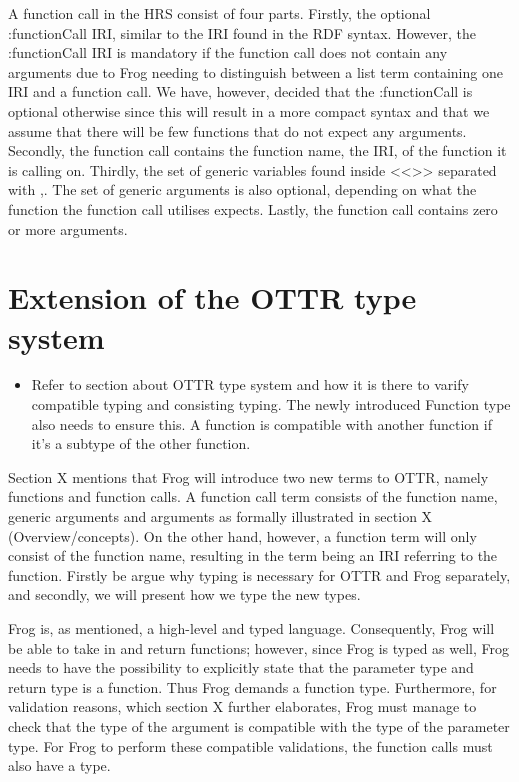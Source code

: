 \para 
A function call in the HRS consist of four parts. Firstly, the optional :functionCall IRI,  similar to the IRI found in the RDF syntax. However, the :functionCall  IRI is mandatory if the function call does not contain any arguments due to Frog needing to distinguish between a list term containing one IRI and a function call. We have, however, decided that the :functionCall is optional otherwise since this will result in a more compact syntax and that we assume that there will be few functions that do not expect any arguments. Secondly, the function call contains the function name, the IRI, of the function it is calling on. Thirdly, the set of generic variables found inside <<>> separated with ,.  The set of generic arguments is also optional, depending on what the function the function call utilises expects. Lastly, the function call contains zero or more arguments.


\section{Extension of the OTTR type system}
\label{extension_ottr_type}
\begin{itemize}
    \item Refer to section about OTTR type system and how it is there to varify compatible typing and consisting typing. The newly introduced Function type also needs to ensure this. A function is compatible with  another function if it's a subtype of the other function.
\end{itemize}

Section X mentions that Frog will introduce two new terms to OTTR, namely functions and function calls. A function call term consists of the function name, generic arguments and arguments as formally illustrated in section X (Overview/concepts). On the other hand, however, a function term will only consist of the function name, resulting in the term being an IRI referring to the function. Firstly be argue why typing is necessary for OTTR and Frog separately, and secondly, we will present how we type the new types.

\para
Frog is, as mentioned, a high-level and typed language. Consequently, Frog will be able to take in and return functions; however, since Frog is typed as well, Frog needs to have the possibility to explicitly state that the parameter type and return type is a function. Thus Frog demands a function type. Furthermore, for validation reasons, which section X further elaborates, Frog must manage to check that the type of the argument is compatible with the type of the parameter type. For Frog to perform these compatible validations, the function calls must also have a type.

